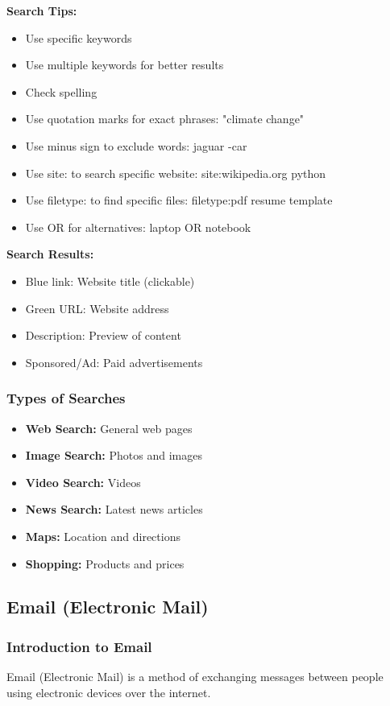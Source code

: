 \documentclass[12pt,a4paper]{article}
\begin{document}
\textbf{Search Tips:}
\begin{itemize}
    \item Use specific keywords
    \item Use multiple keywords for better results
    \item Check spelling
    \item Use quotation marks for exact phrases: "climate change"
    \item Use minus sign to exclude words: jaguar -car
    \item Use site: to search specific website: site:wikipedia.org python
    \item Use filetype: to find specific files: filetype:pdf resume template
    \item Use OR for alternatives: laptop OR notebook
\end{itemize}

\textbf{Search Results:}
\begin{itemize}
    \item Blue link: Website title (clickable)
    \item Green URL: Website address
    \item Description: Preview of content
    \item Sponsored/Ad: Paid advertisements
\end{itemize}

\subsubsection{Types of Searches}
\begin{itemize}
    \item \textbf{Web Search:} General web pages
    \item \textbf{Image Search:} Photos and images
    \item \textbf{Video Search:} Videos
    \item \textbf{News Search:} Latest news articles
    \item \textbf{Maps:} Location and directions
    \item \textbf{Shopping:} Products and prices
\end{itemize}

\subsection{Email (Electronic Mail)}

\subsubsection{Introduction to Email}
Email (Electronic Mail) is a method of exchanging messages between people using electronic devices over the internet.
\end{document}
